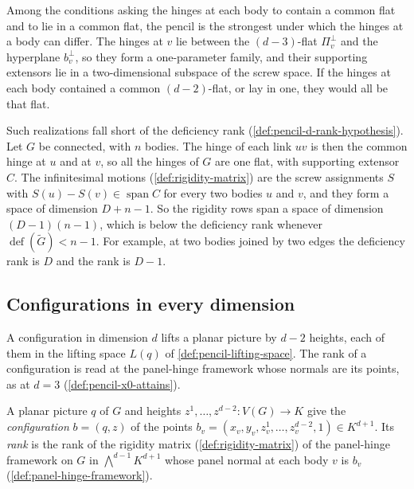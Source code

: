 \begin{remark}
  \label{rem:pencil-d-strongest}
  Among the conditions asking the hinges at each body to contain a
  common flat and to lie in a common flat, the pencil is the strongest
  under which the hinges at a body can differ. The hinges at $v$ lie
  between the $(d-3)$-flat $\Pi_v^{\perp}$ and the hyperplane
  $b_v^{\perp}$, so they form a one-parameter family, and their
  supporting extensors lie in a two-dimensional subspace of the screw
  space. If the hinges at each body contained a common $(d-2)$-flat, or
  lay in one, they would all be that flat.

  Such realizations fall short of the deficiency rank
  (\cref{def:pencil-d-rank-hypothesis}). Let $G$ be connected, with $n$
  bodies. The hinge of each link $uv$ is then the common hinge at $u$
  and at $v$, so all the hinges of $G$ are one flat, with supporting
  extensor $C$. The infinitesimal motions (\cref{def:rigidity-matrix})
  are the screw assignments $S$ with $S(u) - S(v) \in \operatorname{span} C$
  for every two bodies $u$ and $v$, and they form a space of dimension
  $D + n - 1$. So the rigidity rows span a space of dimension
  $(D-1)(n-1)$, which is below the deficiency rank whenever
  $\operatorname{def}(\tilde G) < n - 1$. For example, at two bodies
  joined by two edges the deficiency rank is $D$ and the rank is
  $D - 1$.
\end{remark}

\subsection{Configurations in every dimension}
\label{sec:pencil-d-carrier}

A configuration in dimension $d$ lifts a planar picture by $d - 2$
heights, each of them in the lifting space $L(q)$ of
\cref{def:pencil-lifting-space}. The rank of a configuration is read at
the panel-hinge framework whose normals are its points, as at $d = 3$
(\cref{def:pencil-x0-attains}).

\begin{definition}
  \label{def:pencil-d-configuration}
  \leanok
  A planar picture $q$ of $G$ and heights
  $z^1, \dots, z^{d-2} \colon V(G) \to K$ give the
  \emph{configuration} $b = (q, z)$ of the points
  $b_v = (x_v, y_v, z^1_v, \dots, z^{d-2}_v, 1) \in K^{d+1}$. Its
  \emph{rank} is the rank of the rigidity matrix
  (\cref{def:rigidity-matrix}) of the panel-hinge framework on $G$ in
  $\bigwedge^{d-1} K^{d+1}$ whose panel normal at each body $v$ is $b_v$
  (\cref{def:panel-hinge-framework}).
\end{definition}

